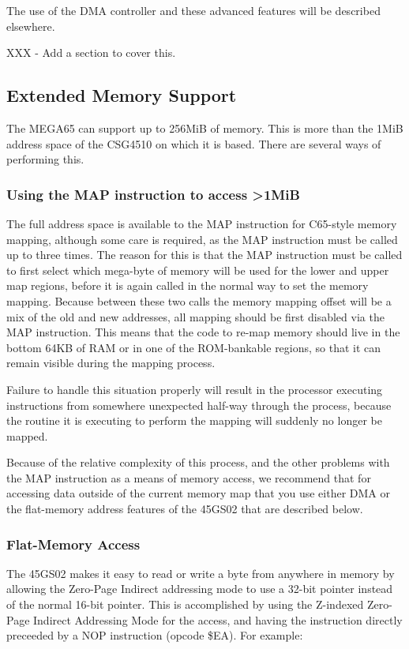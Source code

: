 The use of the DMA controller and these advanced features will be described elsewhere.

XXX - Add a section to cover this.

\subsection{Extended Memory Support}

The MEGA65 can support up to 256MiB of memory. This is more than the 1MiB address space of the CSG4510
on which it is based. There are several ways of performing this.

\subsubsection{Using the MAP instruction to access >1MiB}

The full address space is available to the MAP instruction for C65-style memory
mapping, although some care is required, as the MAP instruction must be called up to three times.
The reason for this is that the MAP instruction must be called to first select which mega-byte of
memory will be used for the lower and upper map regions, before it is again called in the normal
way to set the memory mapping.  Because between these two calls the memory mapping offset will be
a mix of the old and new addresses, all mapping should be first disabled via the MAP instruction.
This means that the code to re-map memory should live in the bottom 64KB of RAM or in one of the
ROM-bankable regions, so that it can remain visible during the mapping process.

Failure to handle this situation properly will result in the processor executing instructions
from somewhere unexpected half-way through the process, because the routine it is executing
to perform the mapping will suddenly no longer be mapped.

Because of the relative complexity of this process, and the other problems with the MAP instruction
as a means of memory access, we recommend that for accessing data outside of the current memory
map that you use either DMA or the flat-memory address features of the 45GS02 that are described below.

\subsubsection{Flat-Memory Access}

The 45GS02 makes it easy to read or write a byte from anywhere in memory by allowing the Zero-Page Indirect
addressing mode to use a 32-bit pointer instead of the normal 16-bit pointer.  This is accomplished by
using the Z-indexed Zero-Page Indirect Addressing Mode for the access, and having the instruction directly
preceeded by a NOP instruction (opcode \$EA).  For example:

